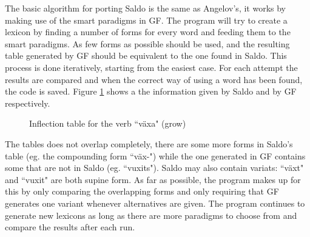 \documentclass{report}
\begin{document}
The basic algorithm for porting Saldo is the same as Angelov's, it works by
making use of the smart paradigms in GF.
The program will try to create a lexicon by finding a number of forms for every
word and feeding them to the smart paradigms. As few forms as possible should be
used, and the resulting table generated by GF should be equivalent to the one found
in Saldo. This process is done iteratively,
starting from the easiest case. For each attempt the results are compared and when
the correct way of using a word has been found, the code is saved.
Figure \ref{pic:TabVax} shows a the information given by Saldo and by GF respectively.\\
\begin{figure}[h]
  \begin{center}
\hspace{5mm}
\caption{Inflection table for the verb ``växa" (grow)}
\label{pic:TabVax}
  \end{center}
\end{figure}
The tables does not overlap completely, there are some more forms in Saldo's table (eg. the 
compounding form ``väx-")
while the one generated in GF contains some that are not in Saldo (eg. ``vuxits").
Saldo may also contain variats: ``växt" and ``vuxit" are both supine form.
As far as possible, the program makes up for this by only comparing the overlapping forms
and only requiring that GF generates one variant whenever alternatives are given. 
The program continues to generate new lexicons as long as there are more
paradigms to choose from and compare the results after each run.
\end{document}
